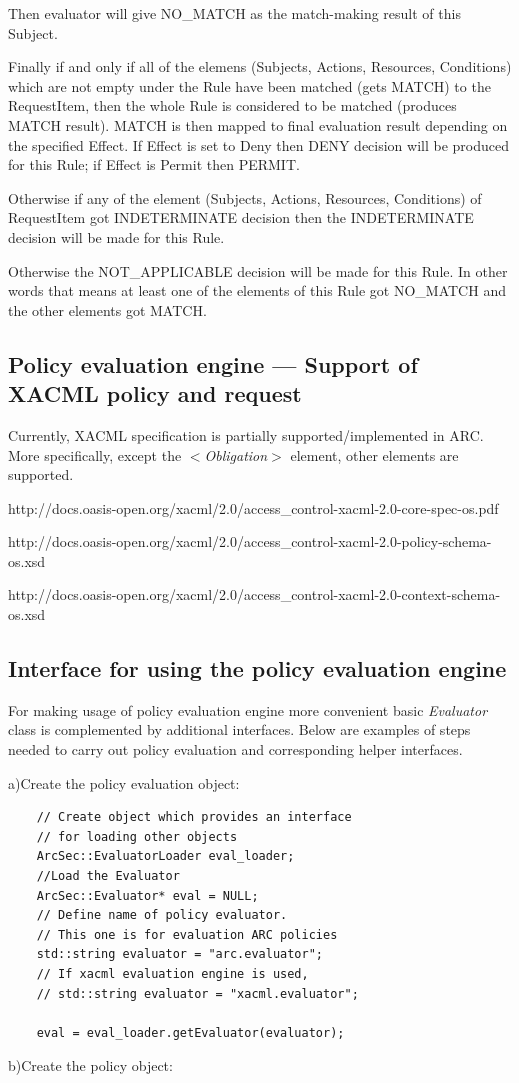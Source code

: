 \documentclass{article}                            %
\begin{document}
Then evaluator will give NO\_MATCH as the match-making result of this Subject.

Finally if and only if all of the elemens (Subjects, Actions, Resources, Conditions) which are not empty under the Rule have been matched (gets MATCH) to the RequestItem, then the whole Rule is considered to be matched (produces MATCH result). MATCH is then mapped to final evaluation result depending on the specified Effect. If Effect is set to Deny then DENY decision will be produced for this Rule; if Effect is Permit then PERMIT.

Otherwise if any of the element (Subjects, Actions, Resources, Conditions) of RequestItem got INDETERMINATE decision then the INDETERMINATE decision will be made for this Rule.

Otherwise the NOT\_APPLICABLE decision will be made for this Rule. In other words that means at least one of the elements of this Rule got NO\_MATCH and the other elements got MATCH.

\subsection{Policy evaluation engine --- Support of XACML policy and request} %
\label{subsec:policy_engine_xacml}
Currently, XACML specification is partially supported/implemented in ARC. More specifically, except the \textit{$<$Obligation$>$} element, other elements are supported.

http://docs.oasis-open.org/xacml/2.0/access\_control-xacml-2.0-core-spec-os.pdf

http://docs.oasis-open.org/xacml/2.0/access\_control-xacml-2.0-policy-schema-os.xsd

http://docs.oasis-open.org/xacml/2.0/access\_control-xacml-2.0-context-schema-os.xsd


\subsection{Interface for using the policy evaluation engine} %
\label{subsec:interface_policy_engine}

For making usage of policy evaluation engine more convenient basic \textit{Evaluator} class is complemented by additional interfaces. Below are examples of steps needed to carry out policy evaluation and corresponding helper interfaces.

a)Create the policy evaluation object:

\begin{verbatim}
    // Create object which provides an interface 
    // for loading other objects
    ArcSec::EvaluatorLoader eval_loader; 
    //Load the Evaluator 
    ArcSec::Evaluator* eval = NULL;
    // Define name of policy evaluator.
    // This one is for evaluation ARC policies
    std::string evaluator = "arc.evaluator"; 
    // If xacml evaluation engine is used, 
    // std::string evaluator = "xacml.evaluator"; 

    eval = eval_loader.getEvaluator(evaluator);
\end{verbatim}
b)Create the policy object:
\end{document}
